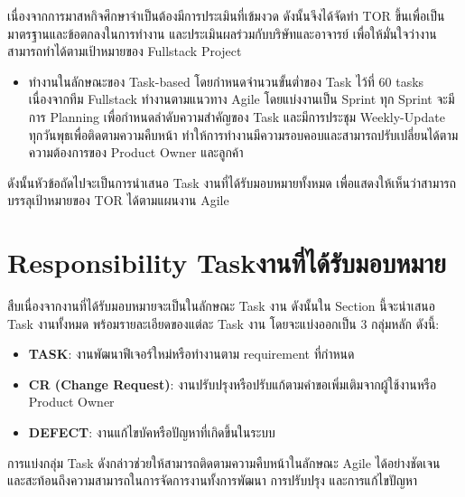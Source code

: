 เนื่องจากการมาสหกิจศึกษาจำเป็นต้องมีการประเมินที่เข้มงวด ดังนั้นจึงได้จัดทำ TOR ขึ้นเพื่อเป็นมาตรฐานและข้อตกลงในการทำงาน  
และประเมินผลร่วมกับบริษัทและอาจารย์ เพื่อให้มั่นใจว่างานสามารถทำได้ตามเป้าหมายของ Fullstack Project  

\begin{itemize}
    \item ทำงานในลักษณะของ Task-based โดยกำหนดจำนวนขั้นต่ำของ Task ไว้ที่ 60 tasks  
    เนื่องจากทีม Fullstack ทำงานตามแนวทาง Agile โดยแบ่งงานเป็น Sprint  
    ทุก Sprint จะมีการ Planning เพื่อกำหนดลำดับความสำคัญของ Task  
    และมีการประชุม Weekly-Update ทุกวันพุธเพื่อติดตามความคืบหน้า ทำให้การทำงานมีความรอบคอบและสามารถปรับเปลี่ยนได้ตามความต้องการของ Product Owner และลูกค้า
\end{itemize}
ดังนั้นหัวข้อถัดไปจะเป็นการนำเสนอ Task งานที่ได้รับมอบหมายทั้งหมด เพื่อแสดงให้เห็นว่าสามารถบรรลุเป้าหมายของ TOR ได้ตามแผนงาน Agile

\section{\ifenglish Responsibility Task\else งานที่ได้รับมอบหมาย\fi}

สืบเนื่องจากงานที่ได้รับมอบหมายจะเป็นในลักษณะ Task งาน  
ดังนั้นใน Section นี้จะนำเสนอ Task งานทั้งหมด พร้อมรายละเอียดของแต่ละ Task งาน  
โดยจะแบ่งออกเป็น 3 กลุ่มหลัก ดังนี้:

\begin{itemize}
    \item \textbf{TASK}: งานพัฒนาฟีเจอร์ใหม่หรือทำงานตาม requirement ที่กำหนด
    \item \textbf{CR (Change Request)}: งานปรับปรุงหรือปรับแก้ตามคำขอเพิ่มเติมจากผู้ใช้งานหรือ Product Owner
    \item \textbf{DEFECT}: งานแก้ไขบัคหรือปัญหาที่เกิดขึ้นในระบบ
\end{itemize}
การแบ่งกลุ่ม Task ดังกล่าวช่วยให้สามารถติดตามความคืบหน้าในลักษณะ Agile ได้อย่างชัดเจน  
และสะท้อนถึงความสามารถในการจัดการงานทั้งการพัฒนา การปรับปรุง และการแก้ไขปัญหา


